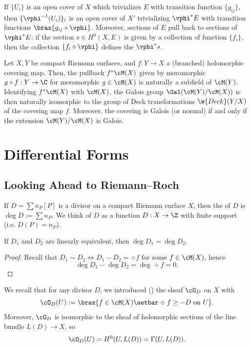 \documentclass[11pt]{report}
\begin{document}
\begin{prop}
If $\{U_i\}$ is an open cover of $X$ which trivializes $E$ with transition function $\{g_{ij}\}$, then $\{\vphi^{-1}(U_i)\}_i$ is an open cover of $X'$ trivializing $\vphi^*E$ with transition functions $\brax{g_{ij}\circ \vphi}$. Moreover, sections of $E$ pull back to sections of $\vphi^*E$: if the section $s \in H^0(X,E)$ is given by a collection of function $\{f_i\}$, then the collection $\{f_i \circ \vphi\}$ defines the  $\vphi^*s$.
\end{prop}

\begin{rmk}
Let $X,Y$ be compact Riemann surfaces, and $f:Y \to X$ a (branched) holomorphic covering map. Then, the pullback $f^*\cM(X)$ given by meromorphic $g\circ f :Y \to \C$ for meromorphic $g \in \cM(X)$ is naturally a subfield of $\cM(Y)$. Identifying $f^*\cM(X)$ with $\cM(X)$, the Galois group $\Gal(\cM(Y)/\cM(X))$ is then naturally isomorphic to the group of Deck transformations $\w{Deck}(Y/X)$ of the covering map $f$. Moreover, the covering is Galois (or normal) if and only if the extension $\cM(Y)/\cM(X)$ is Galois.
\end{rmk}

\chapter{Differential Forms}

\section{Looking Ahead to Riemann--Roch}

\begin{defn}
If $D = \sum n_P[P]$ is a divisor on a compact Riemann surface $X$, then the  of $D$ is $\deg D:= \sum n_P$. We think of $D$ as a function $D:X \to \Z$ with finite support (i.e. $D(P)=n_P$).
\end{defn}

\begin{prop}
If $D_1$ and $D_2$ are linearly equivalent, then $\deg D_1=\deg D_2$.
\end{prop}

\begin{proof}
Recall that $D_1 \sim D_2 \iff D_1 -D_2 = \div f$ for some $f \in \cM(X)$, hence
\[
\deg D_1 - \deg D_2 = \deg \div f=0.
\]
\end{proof}

We recall that for any divisor $D$, we introduced () the sheaf $\cO_D$ on $X$ with
\[
\cO_D(U):=\brax{ f \in \cM(X) \setbar \div f \geq -D \text{ on } U}.
\]
Moreover, $\cO_D$ is isomorphic to the sheaf of holomorphic sections of the line bundle $L(D) \to X$, so
\[
\cO_D(U) = H^0(U,L(D))= \Gamma (U,L(D)).
\]
\end{document}

